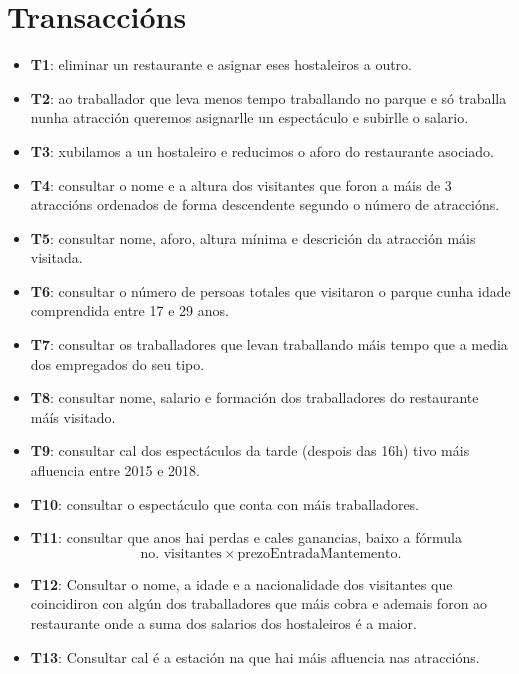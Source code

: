 \documentclass[12pt,a4paper]{book}
\theoremstyle{definition}
\theoremstyle{break}
\begin{document}
\section{Transaccións}
\begin{itemize}
  \item \textbf{T1}: eliminar un restaurante e asignar eses hostaleiros a outro.

  \item \textbf{T2}: ao traballador que leva menos tempo traballando no parque e só traballa nunha atracción queremos asignarlle un espectáculo e subirlle o salario.

  \item \textbf{T3}: xubilamos a un hostaleiro e reducimos o aforo do restaurante asociado.

  \item \textbf{T4}: consultar o nome e a altura dos visitantes que foron a máis de 3 atraccións ordenados de forma descendente segundo o número de atraccións.

  \item \textbf{T5}: consultar nome, aforo, altura mínima e descrición da atracción máis visitada.

  \item \textbf{T6}: consultar o número de persoas totales que visitaron o parque cunha idade comprendida entre 17 e 29 anos.

  \item \textbf{T7}: consultar os traballadores que levan traballando máis tempo que a media dos empregados do seu tipo.

  \item \textbf{T8}: consultar nome, salario e formación dos traballadores do restaurante máís visitado.

  \item \textbf{T9}: consultar cal dos espectáculos da tarde (despois das 16h) tivo máis afluencia entre 2015 e 2018.

  \item \textbf{T10}: consultar o espectáculo que conta con máis traballadores.

  \item \textbf{T11}: consultar que anos hai perdas e cales ganancias, baixo a fórmula
  $$\text{no. visitantes}\times \text{prezoEntradaMantemento}.$$

  \item \textbf{T12}: Consultar o nome, a idade e a nacionalidade dos visitantes que coincidiron con algún dos traballadores que máis cobra e ademais foron ao restaurante onde a suma dos salarios dos hostaleiros é a maior.

  \item \textbf{T13}: Consultar cal é a estación na que hai máis afluencia nas atraccións.

\end{itemize}
\end{document}
